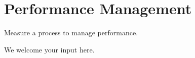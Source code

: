 \section{Performance Management}\label{sec:ekgmm-a-3-1}

Measure a process to manage performance.

\ekgmmContextSection

We welcome your input here.

